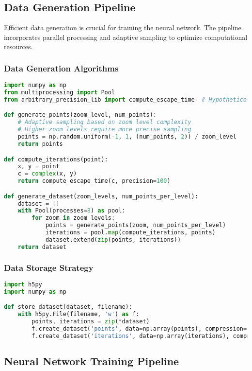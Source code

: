 \documentclass[journal]{IEEEaccess}
\begin{document}
\subsection{Data Generation Pipeline}
Efficient data generation is crucial for training the neural network. The pipeline incorporates parallel processing and adaptive sampling to optimize computational resources.

\subsubsection{Data Generation Algorithms}
\begin{lstlisting}[language=Python, caption=Data Generation using Parallel Processing]
import numpy as np
from multiprocessing import Pool
from arbitrary_precision_lib import compute_escape_time  # Hypothetical library

def generate_points(zoom_level, num_points):
    # Adaptive sampling based on zoom level complexity
    # Higher zoom levels require more precise sampling
    points = np.random.uniform(-1, 1, (num_points, 2)) / zoom_level
    return points

def compute_iterations(point):
    x, y = point
    c = complex(x, y)
    return compute_escape_time(c, precision=100)

def generate_dataset(zoom_levels, num_points_per_level):
    dataset = []
    with Pool(processes=8) as pool:
        for zoom in zoom_levels:
            points = generate_points(zoom, num_points_per_level)
            iterations = pool.map(compute_iterations, points)
            dataset.extend(zip(points, iterations))
    return dataset
\end{lstlisting}

\subsubsection{Data Storage Strategy}
\begin{lstlisting}[language=Python, caption=Storing Dataset in HDF5 Format]
import h5py
import numpy as np

def store_dataset(dataset, filename):
    with h5py.File(filename, 'w') as f:
        points, iterations = zip(*dataset)
        f.create_dataset('points', data=np.array(points), compression='gzip')
        f.create_dataset('iterations', data=np.array(iterations), compression='gzip')
\end{lstlisting}

\subsection{Neural Network Training Pipeline}
\end{document}

